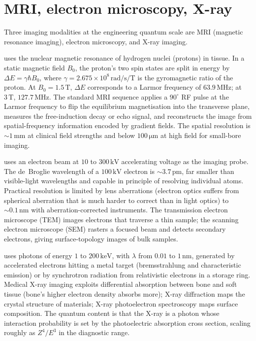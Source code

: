 \section{MRI, electron microscopy, X-ray}

Three imaging modalities at the engineering quantum scale are MRI
(magnetic resonance imaging), electron microscopy, and X-ray
imaging.

 uses the nuclear magnetic resonance of hydrogen nuclei
(protons) in tissue. In a static magnetic field $B_{0}$, the proton's
two spin states are split in energy by $\Delta E = \gamma\hbar B_{0}$,
where $\gamma = 2.675\times 10^{8}\,\si{\radian\per\second\per\tesla}$
is the gyromagnetic ratio of the proton. At $B_{0} = 1.5\,\si{\tesla}$,
$\Delta E$ corresponds to a Larmor frequency of $63.9\,\si{\mega
\hertz}$; at $3\,\si{\tesla}$, $127.7\,\si{\mega\hertz}$. The standard
MRI sequence applies a $90^{\circ}$ RF pulse at the Larmor frequency
to flip the equilibrium magnetisation into the transverse plane,
measures the free-induction decay or echo signal, and reconstructs
the image from spatial-frequency information encoded by gradient
fields. The spatial resolution is $\sim 1\,\si{\milli\meter}$ at
clinical field strengths and below $100\,\si{\micro\meter}$ at high
field for small-bore imaging.

 uses an electron beam at $10$ to
$300\,\si{\kilo\volt}$ accelerating voltage as the imaging probe.
The de~Broglie wavelength of a $100\,\si{\kilo\volt}$ electron is
$\sim 3.7\,\si{\pico\meter}$, far smaller than visible-light
wavelengths and capable in principle of resolving individual atoms.
Practical resolution is limited by lens aberrations (electron
optics suffers from spherical aberration that is much harder to
correct than in light optics) to $\sim 0.1\,\si{\nano\meter}$ with
aberration-corrected instruments. The transmission electron
microscope (TEM) images electrons that traverse a thin sample; the
scanning electron microscope (SEM) rasters a focused beam and detects
secondary electrons, giving surface-topology images of bulk samples.

 uses photons of energy $1$ to $200\,\si{
\kilo\electronvolt}$, with $\lambda$ from $0.01$ to $1\,\si{\nano
\meter}$, generated by accelerated electrons hitting a metal target
(bremsstrahlung and characteristic emission) or by synchrotron
radiation from relativistic electrons in a storage ring. Medical
X-ray imaging exploits differential absorption between bone and soft
tissue (bone's higher electron density absorbs more); X-ray
diffraction maps the crystal structure of materials; X-ray
photoelectron spectroscopy maps surface composition. The quantum
content is that the X-ray is a photon whose interaction probability
is set by the photoelectric absorption cross section, scaling roughly
as $Z^{4}/E^{3}$ in the diagnostic range.

